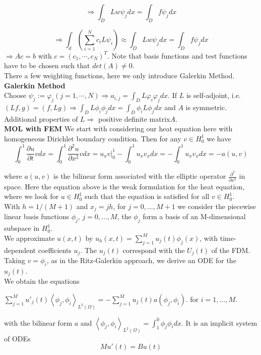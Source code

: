 \documentclass{article}
\begin{document}
$$
\Rightarrow \int_D Lw\psi_jdx = \int_D f\psi_jdx
$$

$$
\Rightarrow \int_d(\sum_{i=1}^N c_iL\psi_i) \approx \int_D Lw\psi_jdx = \int_Df\psi_jdx
$$
$\Rightarrow Ac = b$ with $c = (c_1, \cdots, c_N)^T$. Note that basis functions and test functions have to be chosen such that $det(A) \neq 0$.\\
There a few weighting functions, here we only introduce Galerkin Method.\\
\textbf{Galerkin Method}\\
Choose $\psi_j := \varphi_j(j = 1, \cdots, N) \Rightarrow a_{i,j} = \int_D L\varphi_i \varphi_j dx$. If $L$ is self-adjoint, i.e. $(Lf,g) = (f, Lg) \Rightarrow \int_D L\phi_i\phi_j dx = \int_D \phi_i L \phi_j dx$ and $A$ is symmetric. Additional properties of $L \Rightarrow $ positive definite matrix$A$.\\
\textbf{MOL with FEM}
We start with considering our heat equation here with homogeneous Dirichlet boundary condition. Then for any $v \in H^1_0$ we have
$$
\int_0^1 \frac{\partial u}{\partial t}v dx = \int_0^1 \frac{\partial^2 u}{\partial x^2}v dx = u_x v|^1_0 - \int^1_0 u_x v_x dx = -\int^1_0 u_x v_x dx
= -a(u,v)
$$

where $a(u,v)$ is the bilinear form associated with the elliptic operator $\frac{\partial^2}{\partial x^2}$ in space. Here the equation above is the weak formulation for the heat equation, where we look for $u \in H^1_0$ such that the equation is satisfied for all $v\in H^1_0$.\\
With $h = 1/(M+1)$ and $x_j = jh$, for $j = 0, ... , M+1$ we consider the piecewise linear basis functions  $\phi_j$, $j = 0, ... ,M$, the $\phi_j$ form a basis of an M-dimensional subspace in $H^1_0$.\\
We approximate $u(x,t)$ by $u_h(x,t) = \sum_{j=1}^M u_j(t)\phi_j(x)$, with time-dependent coefficients $u_j$. The $u_j(t)$ correspond with the $U_j(t)$ of the FDM. Taking $v = \phi_i$, as in the Ritz-Galerkin approach, we derive an ODE for the $u_j(t)$.\\
We obtain the equations
\begin{center}
$
\sum^M_{j=1}u'_j(t)\left \langle \phi_j,\phi_i \right \rangle_{L^2(\Omega)} = -\sum_{j=1}^M u_j(t)a(\phi_j,\phi_i)
$. for $i = 1, ... , M$.
\end{center}
with the bilinear form $a$ and $\left \langle \phi_j,\phi_i \right \rangle_{L^2(\Omega)} = \int^0_1 \phi_j \phi_i dx$. It is an implicit system of ODEs
$$
Mu'(t) = Bu(t)
$$
\end{document}
